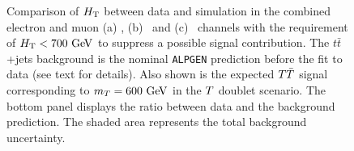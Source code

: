 \begin{figure}[h!tb]\begin{center}
	\caption{Comparison of $\HT$ between data and simulation in the combined
electron and muon (a) \chii, (b) \chiii\ and (c) \chiv\ channels with 
the requirement of $\HT<700\gev$ to suppress a possible signal contribution.
The $t\bar{t}$+jets background is the nominal \texttt{ALPGEN} prediction before the fit to data (see text for details).
Also shown is the expected $\TT$ signal corresponding to $m_{\T}=600\gev$ in the $\T$ doublet scenario.
The bottom panel displays the ratio between data
and the background prediction. The shaded area represents the total background uncertainty.\label{fig:HT_beforefit}}
\end{center}\end{figure}
